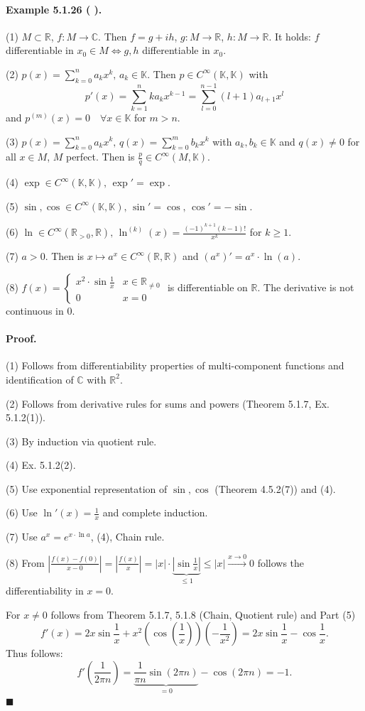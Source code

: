 \documentclass[12pt]{article}
\newcommand{\R}{\mathbb{R}}
\newcommand{\C}{\mathbb{C}}
\newcommand{\K}{\mathbb{K}} %
\newcommand{\NumberedExample}[3]{%
\paragraph*{Example #1 ( #2 ).} #3\par}
\begin{document}
\NumberedExample{5.1.26}{}{
(1) $M \subset \R$, $f : M \to \C$. Then $f = g + ih$, $g : M \to \R$, $h : M \to \R$.
It holds: $f$ differentiable in $x_0 \in M \iff g, h$ differentiable in $x_0$.
\par\medskip
(2) $p(x) = \sum_{k=0}^n a_k x^k, \, a_k \in \K$. Then $p \in C^\infty(\K, \K)$ with
\[
p'(x) = \sum_{k=1}^n k a_k x^{k-1} = \sum_{l=0}^{n-1} (l+1) a_{l+1} x^l
\]
and $p^{(m)}(x) = 0 \quad \forall x \in \K$ for $m > n$.
\par\medskip
(3) $p(x) = \sum_{k=0}^n a_k x^k, \, q(x) = \sum_{k=0}^m b_k x^k$ with $a_k, b_k \in \K$ and $q(x) \neq 0$ for all $x \in M$, $M$ perfect. Then is $\frac{p}{q} \in C^\infty(M, \K)$.
\par\medskip
(4) $\exp \in C^\infty(\K, \K), \, \exp' = \exp$.
\par\medskip
(5) $\sin, \cos \in C^\infty(\K, \K), \, \sin' = \cos, \, \cos' = -\sin$.
\par\medskip
(6) $\ln \in C^\infty(\R_{>0}, \R), \, \ln^{(k)}(x) = \frac{(-1)^{k+1}(k-1)!}{x^k}$ for $k \ge 1$.
\par\medskip
(7) $a > 0$. Then is $x \mapsto a^x \in C^\infty(\R, \R)$ and $(a^x)' = a^x \cdot \ln(a)$.
\par\medskip
(8) $f(x) = \begin{cases} x^2 \cdot \sin \frac{1}{x} & x \in \R_{\neq 0} \\ 0 & x = 0 \end{cases}$ is differentiable on $\R$. The derivative is not continuous in 0.
}

\paragraph*{Proof.}

(1) Follows from differentiability properties of multi-component functions and identification of $\C$ with $\R^2$.
\par
(2) Follows from derivative rules for sums and powers (Theorem 5.1.7, Ex. 5.1.2(1)).
\par
(3) By induction via quotient rule.
\par
(4) Ex. 5.1.2(2).
\par
(5) Use exponential representation of $\sin, \cos$ (Theorem 4.5.2(7)) and (4).
\par
(6) Use $\ln'(x) = \frac{1}{x}$ and complete induction.
\par
(7) Use $a^x = e^{x \cdot \ln a}$, (4), Chain rule.
\par
(8) From $\left| \frac{f(x)-f(0)}{x-0} \right| = \left| \frac{f(x)}{x} \right| = |x| \cdot \underbrace{|\sin \frac{1}{x}|}_{\le 1} \le |x| \xrightarrow{x \to 0} 0$ follows the differentiability in $x = 0$.
\par
For $x \neq 0$ follows from Theorem 5.1.7, 5.1.8 (Chain, Quotient rule) and Part (5)
\[
f'(x) = 2x \sin \frac{1}{x} + x^2 \left( \cos\left(\frac{1}{x}\right) \right) \left(-\frac{1}{x^2}\right) = 2x \sin \frac{1}{x} - \cos \frac{1}{x}.
\]
Thus follows:
\[
f'\left(\frac{1}{2\pi n}\right) = \underbrace{\frac{1}{\pi n} \sin(2\pi n)}_{=0} - \cos(2\pi n) = -1.
\]
\hfill $\blacksquare$
\end{document}
